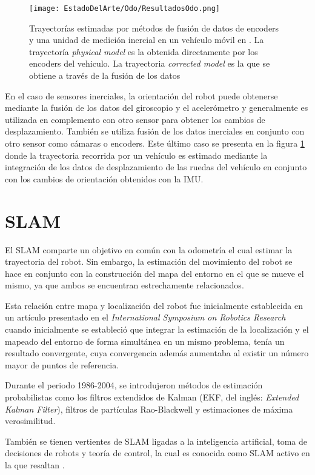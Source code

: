 \begin{figure}[H]
	\centering
	\texttt{[image: EstadoDelArte/Odo/ResultadosOdo.png]}
	\caption{Trayectorías estimadas por métodos de fusión de datos de encoders y una unidad de medición inercial en un vehículo móvil en \cite{odo}. La trayectoría \textit{physical model} es la obtenida directamente por los encoders del vehiculo. La trayectoria \textit{corrected model} es la que se obtiene a través de la fusión de los datos}
	\label{fig:OdoEstimacion}
\end{figure}

En el caso de sensores inerciales, la orientación del robot puede obtenerse mediante la fusión de los datos del giroscopio y el acelerómetro y generalmente es utilizada en complemento con otro sensor para obtener los cambios de desplazamiento. También se utiliza fusión de los datos inerciales en conjunto con otro sensor como cámaras o encoders. Este último caso se presenta en la figura \ref{fig:OdoEstimacion} donde la trayectoria recorrida por un vehículo es estimado mediante la integración de los datos de desplazamiento de las ruedas del vehículo en conjunto con los cambios de orientación obtenidos con la IMU.

\section{SLAM}

El SLAM comparte un objetivo en común con la odometría el cual estimar la trayectoria del robot. Sin embargo, la estimación  del movimiento del robot se hace en conjunto con la construcción del mapa del entorno en el que se mueve el mismo, ya que ambos se encuentran estrechamente relacionados.

Esta relación entre mapa  y localización del robot  fue inicialmente establecida en un artículo presentado en el \textit{International Symposium on Robotics Research}\cite{HarrisAndStephens} cuando inicialmente se estableció que integrar la estimación de la localización y el mapeado del entorno de forma simultánea en un mismo problema, tenía un resultado convergente, cuya convergencia además aumentaba al existir un número mayor de puntos de referencia. 

Durante el periodo 1986-2004, se introdujeron métodos de estimación probabilistas  como los filtros extendidos de Kalman (EKF, del inglés: \textit{Extended Kalman Filter}), filtros de partículas Rao-Blackwell y estimaciones de máxima verosimilitud.

También se tienen vertientes de SLAM ligadas a la inteligencia artificial, toma de decisiones de robots y teoría de control, la cual es conocida como SLAM activo en la que resaltan \cite{Feder, Smith, Makarenko, Stachniss}.


